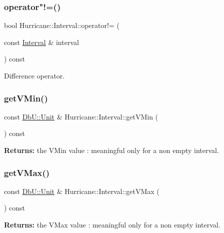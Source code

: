 \subsubsection{\texorpdfstring{operator"!=()}{operator!=()}}
{\footnotesize\ttfamily bool Hurricane\+::\+Interval\+::operator!= (\begin{DoxyParamCaption}\item[{const \mbox{\hyperlink{classHurricane_1_1Interval}{Interval}} \&}]{interval }\end{DoxyParamCaption}) const}

Difference operator. \mbox{\label{classHurricane_1_1Interval_a6e0deb1b38065375a78c7fd6885b5909}} 
\subsubsection{\texorpdfstring{get\+V\+Min()}{getVMin()}}
{\footnotesize\ttfamily const \mbox{\hyperlink{group__DbUGroup_ga4fbfa3e8c89347af76c9628ea06c4146}{Db\+U\+::\+Unit}} \& Hurricane\+::\+Interval\+::get\+V\+Min (\begin{DoxyParamCaption}{ }\end{DoxyParamCaption}) const\hspace{0.3cm}{\ttfamily [inline]}}

{\bfseries Returns\+:} the V\+Min value \+: meaningful only for a non empty interval. \mbox{\label{classHurricane_1_1Interval_a2f5ec659fde913492f89dc215001acb2}} 
\subsubsection{\texorpdfstring{get\+V\+Max()}{getVMax()}}
{\footnotesize\ttfamily const \mbox{\hyperlink{group__DbUGroup_ga4fbfa3e8c89347af76c9628ea06c4146}{Db\+U\+::\+Unit}} \& Hurricane\+::\+Interval\+::get\+V\+Max (\begin{DoxyParamCaption}{ }\end{DoxyParamCaption}) const\hspace{0.3cm}{\ttfamily [inline]}}

{\bfseries Returns\+:} the V\+Max value \+: meaningful only for a non empty interval. \mbox{\label{classHurricane_1_1Interval_a6d12d0404054c7ccadab1afa6683a561}} 
